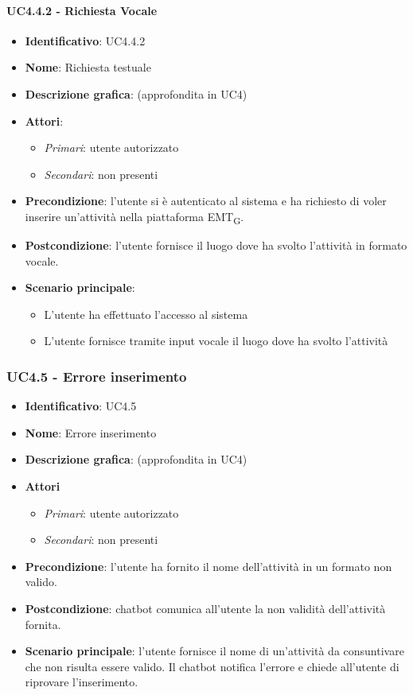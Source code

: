 \paragraph{UC4.4.2 - Richiesta Vocale}
\begin{itemize}
   \item \textbf{Identificativo}: UC4.4.2
   \item \textbf{Nome}: Richiesta testuale
   \item \textbf{Descrizione grafica}: (approfondita in UC4)
   \item \textbf{Attori}:
   \begin{itemize} 
       \item \textit{Primari}: utente autorizzato
       \item \textit{Secondari}: non presenti
   \end{itemize}
       \item \textbf{Precondizione}: l'utente si è autenticato al sistema e ha richiesto di voler inserire un'attività nella piattaforma EMT\textsubscript{G}. 
       \item \textbf{Postcondizione}: l'utente fornisce il luogo dove ha svolto l'attività in formato vocale.
    \item \textbf{Scenario principale}: 
       \begin{itemize}
           \item L'utente ha effettuato l'accesso al sistema 
           \item L'utente fornisce tramite input vocale il luogo dove ha svolto l'attività
       \end{itemize}
\end{itemize}

\subsubsection{UC4.5 - Errore inserimento }
\begin{itemize}
    \item \textbf{Identificativo}: UC4.5
    \item \textbf{Nome}: Errore inserimento 
    \item \textbf{Descrizione grafica}: (approfondita in UC4)
    \item \textbf{Attori}
        \begin{itemize} 
            \item \textit{Primari}: utente autorizzato
            \item \textit{Secondari}: non presenti
        \end{itemize}
    \item \textbf{Precondizione}: l'utente ha fornito il nome dell'attività in un formato non valido. 
    \item \textbf{Postcondizione}: chatbot comunica all'utente la non validità dell'attività fornita.
    \item \textbf{Scenario principale}: l'utente fornisce il nome di un'attività da consuntivare che non risulta essere valido. Il chatbot notifica l'errore e chiede all'utente di riprovare l'inserimento. 
\end{itemize}

